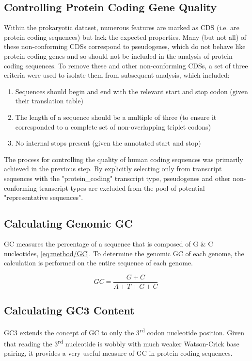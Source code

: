 \documentclass[../main.tex]{subfile}
\begin{document}
    \subsection{Controlling Protein Coding Gene Quality}
        Within the prokaryotic dataset, numerous features are marked as CDS (i.e. are protein coding sequences) but lack the expected properties. Many (but not all) of these non-conforming CDSs correspond to pseudogenes, which do not behave like protein coding genes and so should not be included in the analysis of protein coding sequences. To remove these and other non-conforming CDSs, a set of three criteria were used to isolate them from subsequent analysis, which included:
        \begin{enumerate}
            \item Sequences should begin and end with the relevant start and stop codon (given their translation table)
            \item The length of a sequence should be a multiple of three (to ensure it corresponded to a complete set of non-overlapping triplet codons)
            \item No internal stops present (given the annotated start and stop)
        \end{enumerate}

        The process for controlling the quality of human coding sequences was primarily achieved in the previous step. By explicitly selecting only from transcript sequences with the "protein\_coding" transcript type, pseudogenes and other non-conforming transcript types are excluded from the pool of potential "representative sequences".
    \subsection{Calculating Genomic GC}
        GC measures the percentage of a sequence that is composed of G \& C nucleotides, \cref{eq:method/GC}. To determine the genomic GC of each genome, the calculation is performed on the entire sequence of each genome.

        \begin{equation}
            GC = \frac{G + C}{A + T + G + C} \label{eq:method/GC}
        \end{equation}
    \subsection{Calculating GC3 Content}
        GC3 extends the concept of GC to only the 3\textsuperscript{rd} codon nucleotide position. Given that reading the 3\textsuperscript{rd} nucleotide is wobbly with much weaker Watson-Crick base pairing, it provides a very useful measure of GC in protein coding sequences.
\end{document}
